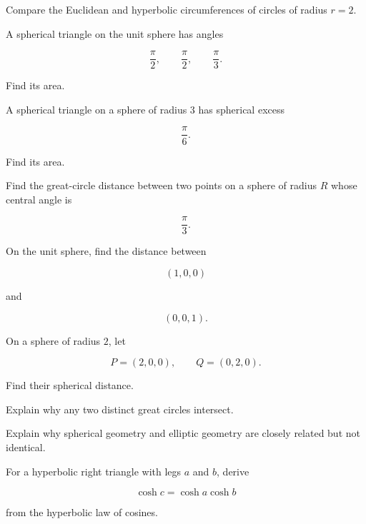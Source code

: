 \begin{exercise}[2]
Compare the Euclidean and hyperbolic circumferences of circles of radius
\(r=2\).
\end{exercise}

\begin{exercise}[2]
A spherical triangle on the unit sphere has angles

\[
\frac{\pi}{2},
\qquad
\frac{\pi}{2},
\qquad
\frac{\pi}{3}.
\]

Find its area.
\end{exercise}

\begin{exercise}[2]
A spherical triangle on a sphere of radius \(3\) has spherical excess

\[
\frac{\pi}{6}.
\]

Find its area.
\end{exercise}

\begin{exercise}[2]
Find the great-circle distance between two points on a sphere of radius \(R\)
whose central angle is

\[
\frac{\pi}{3}.
\]
\end{exercise}

\begin{exercise}[2]
On the unit sphere, find the distance between

\[
(1,0,0)
\]

and

\[
(0,0,1).
\]
\end{exercise}

\begin{exercise}[2]
On a sphere of radius \(2\), let

\[
P=(2,0,0),
\qquad
Q=(0,2,0).
\]

Find their spherical distance.
\end{exercise}

\begin{exercise}[3]
Explain why any two distinct great circles intersect.
\end{exercise}

\begin{exercise}[3]
Explain why spherical geometry and elliptic geometry are closely related but
not identical.
\end{exercise}

\begin{exercise}[3]
For a hyperbolic right triangle with legs \(a\) and \(b\), derive

\[
\cosh c=\cosh a\cosh b
\]

from the hyperbolic law of cosines.
\end{exercise}

